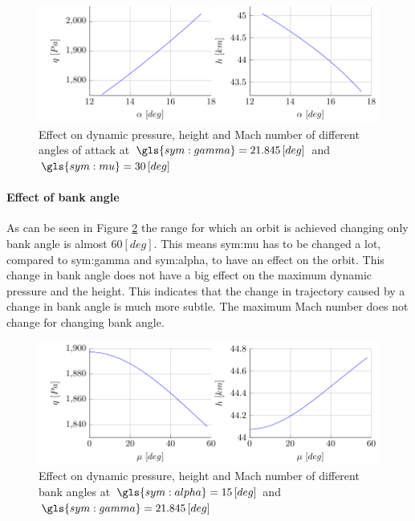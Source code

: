 \begin{figure}[h]
	\centering
	\includegraphics[width=\textwidth]{./Figure/orbit/effectalpha2.pdf}
	\caption[Effect on dynamic pressure, height and Mach number of different angles of attack]{Effect on dynamic pressure, height and Mach number of different angles of attack at $\gls{sym:gamma}=21.845 \left[deg\right]$ and $\gls{sym:mu}=30 \left[deg\right]$}
	\label{fig:effectalpha}
\end{figure}

\paragraph{Effect of bank angle}

As can be seen in Figure \ref{fig:effectmu} the range for which an orbit is achieved changing only bank angle is almost $60 \left[deg\right]$. This means \gls{sym:mu} has to be changed a lot, compared to \gls{sym:gamma} and \gls{sym:alpha}, to have an effect on the orbit. This change in bank angle does not have a big effect on the maximum dynamic pressure and the height. This indicates that the change in trajectory caused by a change in bank angle is much more subtle. The maximum Mach number does not change for changing bank angle.

\begin{figure}[h]
	\centering
	\includegraphics[width=\textwidth]{./Figure/orbit/effectmu2.pdf}
	\caption[Effect on dynamic pressure, height and Mach number of different bank angles]{Effect on dynamic pressure, height and Mach number of different bank angles at $\gls{sym:alpha}=15 \left[deg\right]$ and $\gls{sym:gamma}=21.845 \left[deg\right]$}
	\label{fig:effectmu}
\end{figure}